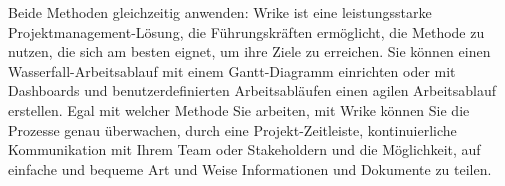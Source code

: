 Beide Methoden gleichzeitig anwenden:
Wrike ist eine leistungsstarke Projektmanagement-Lösung, die Führungskräften ermöglicht, die Methode zu nutzen, die sich am besten eignet, um ihre Ziele zu erreichen. Sie können einen Wasserfall-Arbeitsablauf mit einem Gantt-Diagramm einrichten oder mit Dashboards und benutzerdefinierten Arbeitsabläufen einen agilen Arbeitsablauf erstellen. Egal mit welcher Methode Sie arbeiten, mit Wrike können Sie die Prozesse genau überwachen, durch eine Projekt-Zeitleiste, kontinuierliche Kommunikation mit Ihrem Team oder Stakeholdern und die Möglichkeit, auf einfache und bequeme Art und Weise Informationen und Dokumente zu teilen.

